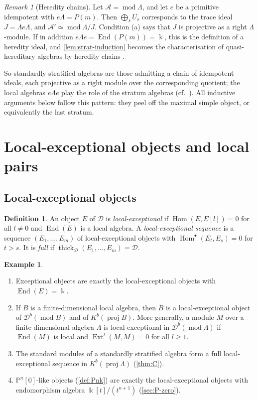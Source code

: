 \documentclass[11pt,reqno]{amsart}
\theoremstyle{plain}
\theoremstyle{definition}
\newtheorem{definition}[theorem]{Definition}
\newtheorem{example}[theorem]{Example}
\theoremstyle{remark}
\newtheorem{remark}[theorem]{Remark}
\newcommand{\kk}{\Bbbk}
\DeclareMathOperator{\Hom}{Hom}
\DeclareMathOperator{\End}{End}
\DeclareMathOperator{\Ext}{Ext}
\newcommand{\modd}{\operatorname{mod}}
\newcommand{\proj}{\operatorname{proj}}
\newcommand{\Db}{\mathcal{D}^b}
\newcommand{\Kb}{K^b}
\newcommand{\thick}[2][\cD]{\operatorname{thick}_{#1}(#2)}
\newcommand{\Pn}[2]{\mathbb{P}^{#1}[#2]}
\newcommand{\cD}{\mathcal{D}}
\newcommand{\cA}{\mathcal{A}}
\begin{document}
\begin{remark}[Heredity chains]\label{rem:heredity}
Let $\cA=\modd\Lambda$, and let $e$ be a primitive idempotent with $e\Lambda=P(m)$. Then $\bigoplus_sU_s$ corresponds to the trace ideal $J=\Lambda e\Lambda$, and $\cA'\simeq\modd\Lambda/J$. Condition (a) says that $J$ is projective as a right $\Lambda$-module. If in addition $e\Lambda e=\End(P(m))=\kk$, this is the definition of a heredity ideal, and \cref{lem:strat-induction} becomes the characterisation of quasi-hereditary algebras by heredity chains \cite{CPS88,DR92}.

So standardly stratified algebras are those admitting a chain of idempotent ideals, each projective as a right module over the corresponding quotient; the local algebras $e\Lambda e$ play the role of the stratum algebras (cf.\ \cite{Dla96,CPS96}). All inductive arguments below follow this pattern: they peel off the maximal simple object, or equivalently the last stratum.
\end{remark}



\section{Local-exceptional objects and local pairs}\label{sec:local}

\subsection{Local-exceptional objects}

\begin{definition}\label{def:local-exc}
An object $E$ of $\cD$ is \emph{local-exceptional} if $\Hom(E,E[l])=0$ for all $l\ne0$ and $\End(E)$ is a local algebra. A \emph{local-exceptional sequence} is a sequence $(E_1,\dots,E_m)$ of local-exceptional objects with $\Hom^\bullet(E_t,E_s)=0$ for $t>s$. It is \emph{full} if $\thick{E_1,\dots,E_m}=\cD$.
\end{definition}

\begin{example}\label{ex:local-exc}
\leavevmode
\begin{enumerate}
\item Exceptional objects are exactly the local-exceptional objects with $\End(E)=\kk$.
\item If $B$ is a finite-dimensional local algebra, then $B$ is a local-exceptional object of $\Db(\modd B)$ and of $\Kb(\proj B)$. More generally, a module $M$ over a finite-dimensional algebra $\Lambda$ is local-exceptional in $\Db(\modd\Lambda)$ if $\End(M)$ is local and $\Ext^l(M,M)=0$ for all $l\ge1$.
\item The standard modules of a standardly stratified algebra form a full local-exceptional sequence in $\Kb(\proj\Lambda)$ (\cref{thm:C}).
\item $\Pn n0$-like objects (\cref{def:Pnk}) are exactly the local-exceptional objects with endomorphism algebra $\kk[t]/(t^{n+1})$ (\cref{sec:P-zero}).
\end{enumerate}
\end{example}
\end{document}
